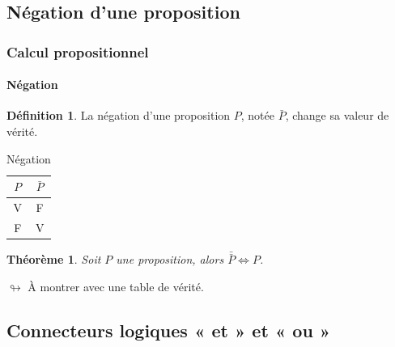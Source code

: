 \documentclass[10pt,notheorems]{beamer}
\theoremstyle{plain}
\newtheorem{theorem}{Théorème}
\theoremstyle{definition} %
\newtheorem{definition}{Définition}
\begin{document}
  \subsection{Négation d'une proposition}

  \begin{frame}
    \frametitle{Calcul propositionnel}
    \framesubtitle{Négation}

  \begin{definition}\label{definition:negation}
    La négation d'une proposition $P$, notée $\bar P$, change sa
    valeur de vérité.
  \end{definition}

  \bigskip

   \begin{table}[H]
     \centering
     \begin{tabular}[H]{|c|c|}
       \hline
       $P$ & $\bar P$\\ \hline
       V & F \\
       F & V \\
       \hline\hline
     \end{tabular}
     \caption{Négation}
     \label{tab:negation}
   \end{table}

    \begin{theorem}\label{theorem:negation}
      Soit $P$ une proposition, alors
      $\bar{\bar P} \Leftrightarrow P$.
    \end{theorem}

    \medskip

    $\looparrowright$ À montrer avec une table de vérité.
  \end{frame}


  \subsection{Connecteurs logiques « et » et « ou »}
\end{document}
